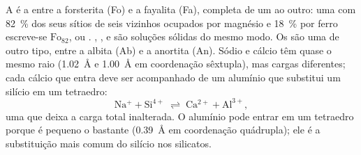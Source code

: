 A  é a  entre a forsterita  (Fo) e a fayalita  (Fa), completa de um  ao outro: uma  com \qty{82}{\percent} dos seus sítios de seis vizinhos ocupados por magnésio e \qty{18}{\percent} por ferro escreve-se $\text{Fo}_{82}$, ou
. , ,  e  são soluções sólidas do mesmo modo. Os   são uma  de outro tipo, entre a albita  (Ab) e a anortita
 (An). Sódio e cálcio têm quase o mesmo raio
(\qty{1.02}{\angstrom} e \qty{1.00}{\angstrom} em coordenação sêxtupla), mas cargas diferentes; cada cálcio que entra deve ser acompanhado de um alumínio que substitui um silício em um tetraedro:
\[
  \mathrm{Na^{+}} + \mathrm{Si^{4+}} \;\rightleftharpoons\; \mathrm{Ca^{2+}} + \mathrm{Al^{3+}},
\]
uma  que deixa a carga total inalterada. O alumínio pode entrar em um tetraedro porque é pequeno o bastante (\qty{0.39}{\angstrom} em coordenação quádrupla); ele é a substituição mais comum do silício nos silicatos.


